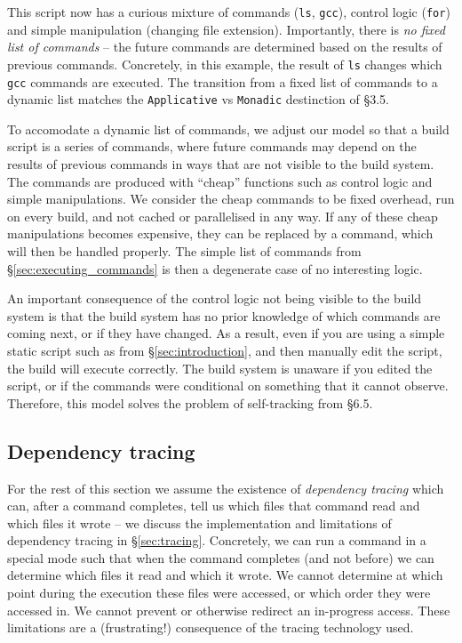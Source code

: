 This script now has a curious mixture of commands (\texttt{ls}, \texttt{gcc}), control logic (\texttt{for}) and simple manipulation (changing file extension). Importantly, there is \emph{no fixed list of commands} -- the future commands are determined based on the results of previous commands. Concretely, in this example, the result of \texttt{ls} changes which \texttt{gcc} commands are executed. The transition from a fixed list of commands to a dynamic list matches the \texttt{Applicative} vs \texttt{Monadic} destinction of \citet{build_systems_a_la_carte} \S3.5.

To accomodate a dynamic list of commands, we adjust our model so that a build script is a series of commands, where future commands may depend on the results of previous commands in ways that are not visible to the build system. The commands are produced with ``cheap'' functions such as control logic and simple manipulations. We consider the cheap commands to be fixed overhead, run on every build, and not cached or parallelised in any way. If any of these cheap manipulations becomes expensive, they can be replaced by a command, which will then be handled properly. The simple list of commands from \S\ref{sec:executing_commands} is then a degenerate case of no interesting logic.

An important consequence of the control logic not being visible to the build system is that the build system has no prior knowledge of which commands are coming next, or if they have changed. As a result, even if you are using a simple static script such as from \S\ref{sec:introduction}, and then manually edit the script, the build will execute correctly. The build system is unaware if you edited the script, or if the commands were conditional on something that it cannot observe. Therefore, this model solves the problem of self-tracking from \citet{build_systems_a_la_carte} \S6.5.

\subsection{Dependency tracing}
\label{sec:assume_tracing}

For the rest of this section we assume the existence of \emph{dependency tracing} which can, after a command completes, tell us which files that command read and which files it wrote -- we discuss the implementation and limitations of dependency tracing in \S\ref{sec:tracing}. Concretely, we can run a command in a special mode such that when the command completes (and not before) we can determine which files it read and which it wrote. We cannot determine at which point during the execution these files were accessed, or which order they were accessed in. We cannot prevent or otherwise redirect an in-progress access. These limitations are a (frustrating!) consequence of the tracing technology used.

